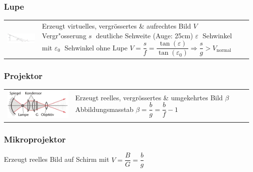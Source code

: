 \subsubsection{Lupe  }
\begin{tabular}{lll}
\parbox{7cm}{\includegraphics[width=7cm]{./bilder/lupe.png}}
	& \parbox{11cm}{
	Erzeugt virtuelles, vergrössertes \& aufrechtes Bild \\ \\
	$V \;$ Vergr"osserung \qquad $s \;$ deutliche Sehweite (Auge: 25cm)\\
	\qquad $\varepsilon \;$ Sehwinkel mit \qquad
$\varepsilon_0 \;$ Sehwinkel ohne Lupe \\ \\
	$V=\dfrac{s}{f}=\dfrac{\tan(\varepsilon)}{\tan(\varepsilon_0)}\Rightarrow\dfrac{s}{g}>
	V_{\text{normal}}$
	 }
\end{tabular}
\subsubsection{Projektor }
\begin{tabular}{ll}
\parbox{6cm}{
	\includegraphics[width=6cm]{./bilder/projektor.png}}
	& \parbox{12cm}{
	Erzeugt reelles, vergrössertes \& umgekehrtes Bild \\ \\
	$\beta \;$ Abbildungsmasstab \\
	$\beta = \dfrac{b}{g} = \dfrac{b}{f}-1$}
\end{tabular}

\subsubsection{Mikroprojektor} 
Erzeugt reelles Bild auf Schirm mit $V=\dfrac{B}{G}=\dfrac{b}{g}$\\

